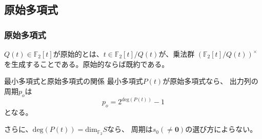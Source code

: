 \documentclass[cjk, dvips, handout, trans, xcolor=dvipsnames]{beamer}
\def\F2{{\mathbb F}_2}
\begin{document}
\subsection{原始多項式}
\begin{frame}[t]
  \frametitle{原始多項式}

  $Q(t) \in \F2[t]$が原始的とは、$t \in \F2[t]/Q(t)$が、乗法群
  $(\F2[t]/Q(t))^{\times}$を生成することである。原始的ならば既約である。

  \begin{block}{最小多項式と原始多項式の関係}
    最小多項式$P(t)$が原始多項式なら、
    出力列の周期$p_o$は
    \[
    p_o = 2^{\mathrm{deg}(P(t))}-1
    \]
    となる。

    さらに、$\mathrm{deg}(P(t)) = \mathrm{dim}_{\F2}S$なら、
    周期は$s_0 (\neq \mathbf{0})$の選び方によらない。
  \end{block}

\end{frame}
\end{document}
